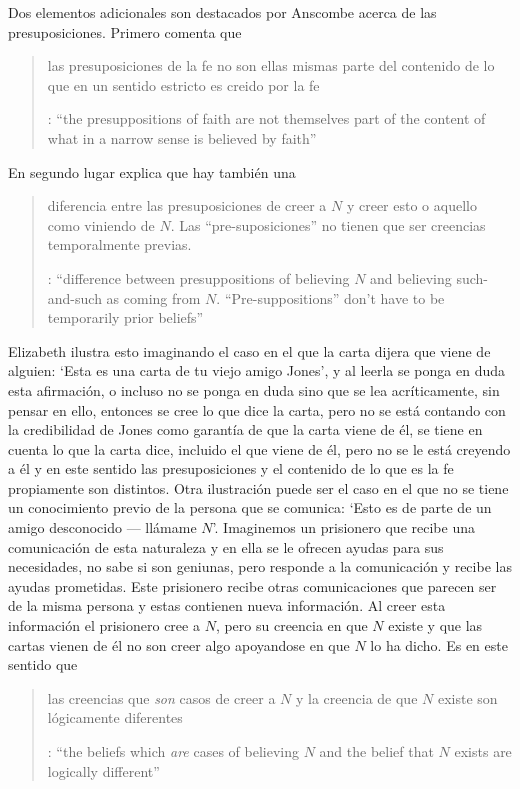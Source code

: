 Dos elementos adicionales son destacados por Anscombe acerca de las presuposiciones. Primero comenta que \blockquote[{\cite[117]{anscombe1981erp:faith}}: \enquote{the presuppositions of faith are not themselves part of the content of what in a narrow sense is believed by faith}]{las presuposiciones de la fe no son ellas mismas parte del contenido de lo que en un sentido estricto es creido por la fe}. En segundo lugar explica que hay también una \blockquote[{\cite[118]{anscombe1981erp:faith}}: \enquote{difference between presuppositions of believing $N$ and believing such-and-such as coming from $N$. ``Pre-suppositions'' don't have to be temporarily prior beliefs}]{diferencia entre las presuposiciones de creer a $N$ y creer esto o aquello como viniendo de $N$. Las ``pre-suposiciones'' no tienen que ser creencias temporalmente previas.}. Elizabeth ilustra esto imaginando el caso en el que la carta dijera que viene de alguien: \enquote*{Esta es una carta de tu viejo amigo Jones}, y al leerla se ponga en duda esta afirmación, o incluso no se ponga en duda sino que se lea acríticamente, sin pensar en ello, entonces se cree lo que dice la carta, pero no se está contando con la credibilidad de Jones como garantía de que la carta viene de él, se tiene en cuenta lo que la carta dice, incluido el que viene de él, pero no se le está creyendo a él y en este sentido las presuposiciones y el contenido de lo que es la fe propiamente son distintos. Otra ilustración puede ser el caso en el que no se tiene un conocimiento previo de la persona que se comunica: \enquote*{Esto es de parte de un amigo desconocido --- llámame $N$}. Imaginemos un prisionero que recibe una comunicación de esta naturaleza y en ella se le ofrecen ayudas para sus necesidades, no sabe si son geniunas, pero responde a la comunicación y recibe las ayudas prometidas. Este prisionero recibe otras comunicaciones que parecen ser de la misma persona y estas contienen nueva información. Al creer esta información el prisionero cree a $N$, pero su creencia en que $N$ existe y que las cartas vienen de él no son creer algo apoyandose en que $N$ lo ha dicho. Es en este sentido que \blockquote[{\cite[118]{anscombe1981erp:faith}}: \enquote{the beliefs which \emph{are} cases of believing $N$ and the belief that $N$ exists are logically different}]{las creencias que \emph{son} casos de creer a $N$ y la creencia de que $N$ existe son lógicamente diferentes}.

